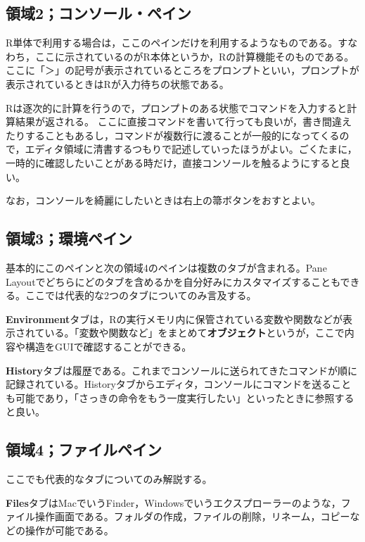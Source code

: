 \documentclass[
  a4paper,
]{ltjsbook}
\begin{document}
\subsection{領域2；コンソール・ペイン}\label{ux9818ux57df2ux30b3ux30f3ux30bdux30fcux30ebux30daux30a4ux30f3}

R単体で利用する場合は，ここのペインだけを利用するようなものである。すなわち，ここに示されているのがR本体というか，Rの計算機能そのものである。ここに「＞」の記号が表示されているところをプロンプトといい，プロンプトが表示されているときはRが入力待ちの状態である。

Rは逐次的に計算を行うので，プロンプトのある状態でコマンドを入力すると計算結果が返される。
ここに直接コマンドを書いて行っても良いが，書き間違えたりすることもあるし，コマンドが複数行に渡ることが一般的になってくるので，エディタ領域に清書するつもりで記述していったほうがよい。ごくたまに，一時的に確認したいことがある時だけ，直接コンソールを触るようにすると良い。

なお，コンソールを綺麗にしたいときは右上の箒ボタンをおすとよい。

\subsection{領域3；環境ペイン}\label{ux9818ux57df3ux74b0ux5883ux30daux30a4ux30f3}

基本的にこのペインと次の領域4のペインは複数のタブが含まれる。Pane
Layoutでどちらにどのタブを含めるかを自分好みにカスタマイズすることもできる。ここでは代表的な2つのタブについてのみ言及する。

\textbf{Environment}タブは，Rの実行メモリ内に保管されている変数や関数などが表示されている。「変数や関数など」をまとめて\textbf{オブジェクト}というが，ここで内容や構造をGUIで確認することができる。

\textbf{History}タブは履歴である。これまでコンソールに送られてきたコマンドが順に記録されている。Historyタブからエディタ，コンソールにコマンドを送ることも可能であり，「さっきの命令をもう一度実行したい」といったときに参照すると良い。

\subsection{領域4；ファイルペイン}\label{ux9818ux57df4ux30d5ux30a1ux30a4ux30ebux30daux30a4ux30f3}

ここでも代表的なタブについてのみ解説する。

\textbf{Files}タブはMacでいうFinder，Windowsでいうエクスプローラーのような，ファイル操作画面である。フォルダの作成，ファイルの削除，リネーム，コピーなどの操作が可能である。
\end{document}
